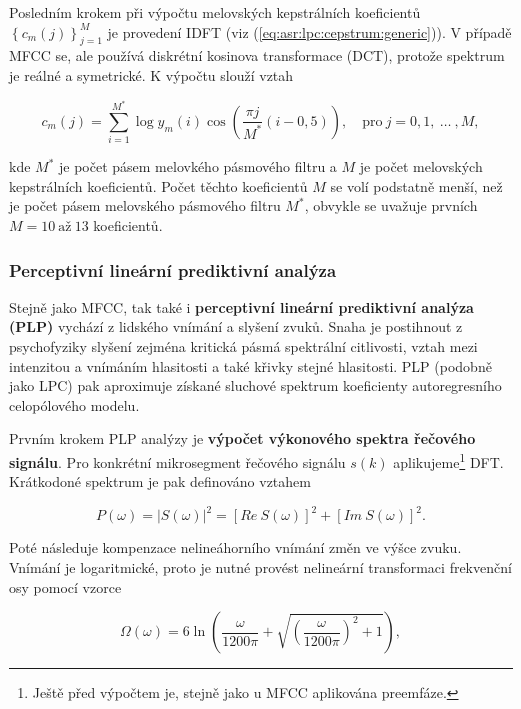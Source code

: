 Posledním krokem při výpočtu melovských kepstrálních koeficientů $\left\{c_m\left(j\right)\right\}_{j=1}^{M}$ je provedení IDFT (viz (\ref{eq:asr:lpc:cepstrum:generic})). V případě MFCC se, ale používá diskrétní kosinova transformace (DCT), protože spektrum je reálné a symetrické. K výpočtu slouží vztah

\begin{equation}
  c_{m}(j) = \sum_{i=1}^{M^{*}} \log y_m(i) \cos\left( \frac{\pi j}{M^{*}}\left(i - 0,5\right) \right),  \quad \text{pro}\ j = 0, 1,\ \dots\ ,M,
  \label{eq:asr:mfcc:coef}
\end{equation}

\noindent kde $M^{*}$ je počet pásem melovkého pásmového filtru a $M$ je počet melovských kepstrálních koeficientů. Počet těchto koeficientů $M$ se volí podstatně menší, než je počet pásem melovského pásmového filtru $M^{*}$, obvykle se uvažuje prvních $M = 10\ \text{až}\ 13$ koeficientů.

\subsubsection{Perceptivní lineární prediktivní analýza}

Stejně jako MFCC, tak také i \textbf{perceptivní lineární prediktivní analýza (PLP)} vychází z lidského vnímání a slyšení zvuků. Snaha je postihnout z psychofyziky slyšení zejména kritická pásmá spektrální citlivosti, vztah mezi intenzitou a vnímáním hlasitosti a také křivky stejné hlasitosti. \cite{Psutka2006} PLP (podobně jako LPC) pak aproximuje získané sluchové spektrum koeficienty autoregresního celopólového modelu.

Prvním krokem PLP analýzy je \textbf{výpočet výkonového spektra řečového signálu}. Pro konkrétní mikrosegment řečového signálu $s(k)$ aplikujeme\footnote{Ještě před výpočtem je, stejně jako u MFCC aplikována preemfáze.} DFT. Krátkodoné spektrum je pak definováno vztahem

\begin{equation}
  P\left(\omega\right) = \left| S\left(\omega\right) \right|^{2} = \left[Re\ S\left(\omega\right)\right]^2 + \left[Im\ S\left( \omega \right) \right]^2.
  \label{eq:asr:plp:spectr}
\end{equation}

\noindent Poté následuje kompenzace nelineáhorního vnímání změn ve výšce zvuku. Vnímání je logaritmické, proto je nutné provést nelineární transformaci frekvenční osy pomocí vzorce

\begin{equation}
  \Omega\left(\omega\right) = 6 \ln \left( \frac{\omega}{1200\pi} + \sqrt{\left(\frac{\omega}{1200\pi}\right)^2 + 1} \right),
  \label{eq:asr:plp:transform}
\end{equation}

